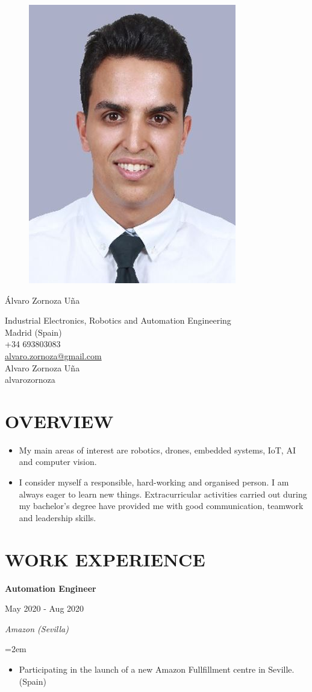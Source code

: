 \documentclass[10pt,a4paper,oneside]{book}
\newcommand{\sepspace}{\vspace*{0pt}}		%
\newcommand{\MyName}[1]{ %
		\Huge \usefont{OT1}{phv}{b}{n} \hfill #1
		\par \normalsize \normalfont}
\newcommand{\MySlogan}[1]{ %
		\large 
		\hfill #1
		\par \normalsize \normalfont}
\newcommand{\NewPart}[2]{\section*{\uppercase{#1} #2}}
\newcommand{\EducationEntrya}[4]{\noindent\ignorespaces	
		\begin{minipage}[t][][b]{0.8\textwidth} \raggedright{\textbf{#1}} \end{minipage} \hfill 
		\begin{minipage}[t][][b]{0.2\textwidth} \hfill\color{Black}#2\end{minipage} 
		 
		\noindent \textit{#3} \par        %
		\noindent\hangindent=2em\hangafter=0 \small #4 
		\normalsize \par}
\begin{document}

\begin{figure}
	\vspace*{-2em}
		\includegraphics[width=.19\textwidth]{Assets/picture.JPG}
\end{figure}

\MyName{Álvaro Zornoza Uña}
\MySlogan{\vspace{-0.15in}\begin{flushright} 
\hfill Industrial Electronics, Robotics and Automation Engineering \\ Madrid (Spain) \\ +34 693803083 \\ 
\href{mailto:alvaro.zornoza@gmail.com}{alvaro.zornoza@gmail.com} \\ \href{https://www.linkedin.com/in/alvaro-zornoza/}{ \faLinkedin} Alvaro Zornoza Uña \\ \href{https://github.com/alvarozornoza}{ \faGithub} alvarozornoza \\ 
\end{flushright}}

\vspace{0.01in}
\sepspace
 \NewPart{Overview}{}
 
 \begin{itemize}
 \item My main areas of interest are robotics, drones, embedded systems, IoT, AI and computer vision.
 \item I consider myself a responsible, hard-working and organised person. I am always eager to learn new things. Extracurricular activities carried out during my bachelor's degree have provided me with good communication, teamwork and leadership skills.
 \end{itemize}

\NewPart{Work Experience}{}

\EducationEntrya{Automation Engineer}{May 2020 - Aug 2020}{Amazon (Sevilla)}{\begin{itemize}
    \item Participating in the launch of a new Amazon Fullfillment centre in Seville. (Spain)
\end{itemize}}
\sepspace
\end{document}
